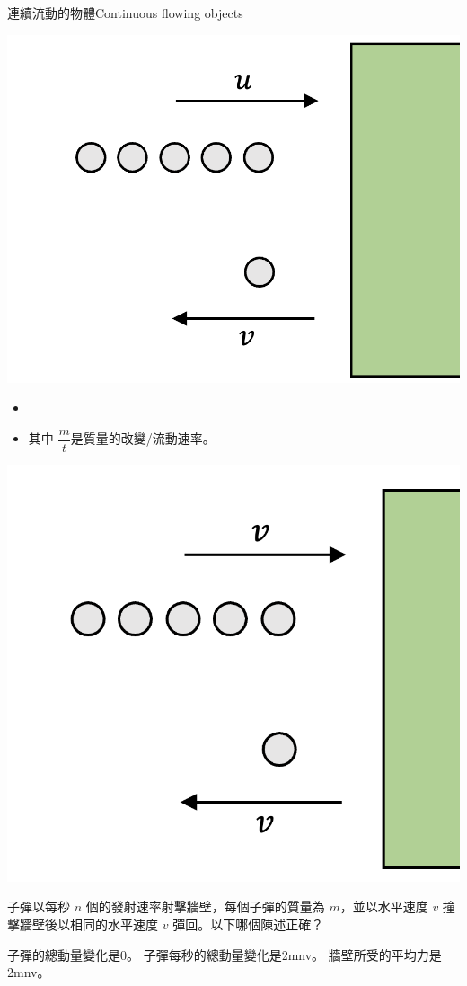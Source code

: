 \documentclass[beamer=true]{standalone}
\begin{document}
\begin{frame}{連續流動的物體Continuous flowing objects}
    \par
    {\par\centering
        \includegraphics[width=.4\textwidth]{assets/9bad99da.png}
        \par}
    \begin{itemize}
        \item {}
        \item 其中 $\dfrac{m}{t}$是質量的改變/流動速率。
    \end{itemize}
\end{frame}

\begin{eg}
    \par{\par\centering
        \includegraphics[width=.4\textwidth]{assets/75a1ea9d.png}
        \par}
    子彈以每秒 $n$ 個的發射速率射擊牆壁，每個子彈的質量為 $m$，並以水平速度 $v$ 撞擊牆壁後以相同的水平速度 $v$ 彈回。以下哪個陳述正確？

\end{eg}

\begin{eg}
    \begin{tasks}
        \task [(1)] 子彈的總動量變化是$0$。
        \task [(2)] 子彈每秒的總動量變化是2mnv。
        \task [(3)] 牆壁所受的平均力是2mnv。
    \end{tasks}
\end{eg}
\end{document}
